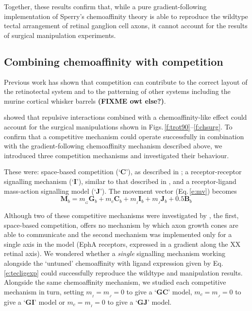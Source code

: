 \documentclass[11pt, a4paper]{article}
\begin{document}
Together, these results confirm that, while a pure gradient-following
implementation of Sperry's chemoaffinity theory is able to reproduce the
wildtype tectal arrangement of retinal ganglion cell axons, it cannot account
for the results of surgical manipulation experiments.

\subsection*{Combining chemoaffinity with competition}

Previous work has shown that competition can contribute to the correct layout
of the retinotectal system \citep{stuff} and to the patterning of other
systems including the murine cortical whisker
barrels \citep{james_modelling_2020} \textbf{(FIXME owt else?)}.

\citet{simpson_simple_2011} showed that repulsive interactions combined with a
chemoaffinity-like effect could account for the surgical manipulations shown
in Figs.\,\ref{f:trot90}--\ref{f:chsurg}. To confirm that a competitive
mechanism could operate successfully in combination with the
gradient-following chemoaffinity mechanism described above, we introduced
three competition mechanisms and investigated their behaviour.

These were: space-based competition (`$\mathbf{C}$'), as described
in \citet{simpson_simple_2011}; a receptor-receptor signalling mechanism
(`$\mathbf{I}$'), similar to that described in \citet{simpson_simple_2011},
and a receptor-ligand mass-action signalling model
(`$\mathbf{J}$'). The movement vector (Eq.\,\ref{e:mv}) becomes
%
\begin{equation} \label{e:mv2}
\mathbf{M}_{b} = m_{\!_G} \mathbf{G}_b +  m_c \mathbf{C}_b +  m_{\!_I} \mathbf{I}_b +  m_{\!_J} \mathbf{J}_b + 0.5 \mathbf{B}_b
\end{equation}
%

Although two of these competitive mechanisms were investigated
by \citet{simpson_simple_2011}, the first, space-based competition, offers no
mechanism by which axon growth cones are able to communicate and the second
mechanism was implemented only for a single axis in the model (EphA receptors,
expressed in a gradient along the XX retinal axis). We wondered whether a
\emph{single} signalling mechanism working alongside the `untuned'
chemoaffinity with ligand expression given by Eq.\,\ref{e:tecligexp} could
successfully reproduce the wildtype and manipulation results. Alongside the
same chemoaffinity mechanism, we studied each competitive mechanism in turn,
setting $m_{\!_I}=m_{\!_J}=0$ to give a `$\mathbf{GC}$' model,
$m_c=m_{\!_J}=0$ to give a `$\mathbf{GI}$' model or $m_c=m_{\!_I}=0$ to give a
`$\mathbf{GJ}$' model.
\end{document}
